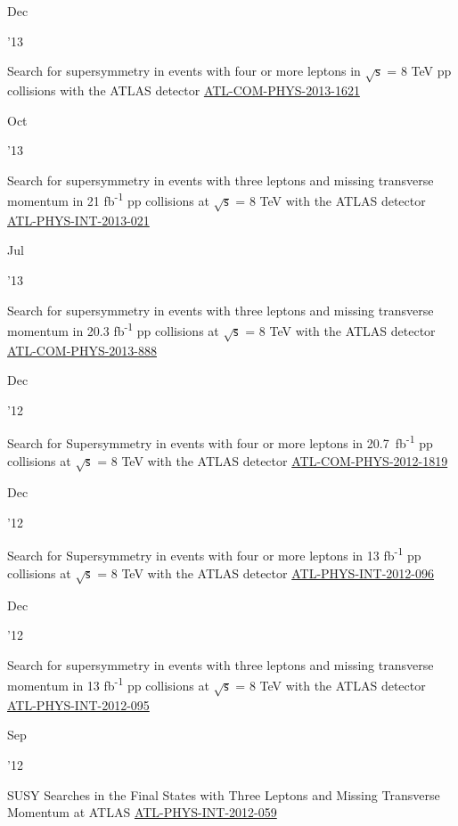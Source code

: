 \documentclass[]{cv} %
\begin{document}
\begin{entrylist}

\entry
{\parbox[t]{\parboxWidthOne}{Dec}\parbox[t]{\parboxWidthTwo}{\hfill '13}}
{Search for supersymmetry in events with four or more leptons in $\sqrt{\mathsf{s}}$ = 8 TeV pp collisions with the ATLAS
detector}
{\href{https://cds.cern.ch/record/1635455}{ATL-COM-PHYS-2013-1621}}
{\vspace*{\spacingPubs}}

\entry
{\parbox[t]{\parboxWidthOne}{Oct}\parbox[t]{\parboxWidthTwo}{\hfill '13}}
{Search for supersymmetry in events with three leptons and missing transverse momentum in 21 fb\textsuperscript{-1} pp collisions
at $\sqrt{\mathsf{s}}$ = 8 TeV with the ATLAS detector}
{\href{https://cds.cern.ch/record/1610185}{ATL-PHYS-INT-2013-021}}
{\vspace*{\spacingPubs}}

\entry
{\parbox[t]{\parboxWidthOne}{Jul}\parbox[t]{\parboxWidthTwo}{\hfill '13}}
{Search for supersymmetry in events with three leptons and missing transverse momentum in 20.3 fb\textsuperscript{-1} pp
collisions at $\sqrt{\mathsf{s}}$ = 8 TeV with the ATLAS detector}
{\href{https://cds.cern.ch/record/1558985}{ATL-COM-PHYS-2013-888}}
{\vspace*{\spacingPubs}}

\entry
{\parbox[t]{\parboxWidthOne}{Dec}\parbox[t]{\parboxWidthTwo}{\hfill '12}}
{Search for Supersymmetry in events with four or more leptons in 20.7~fb\textsuperscript{-1} pp collisions at $\sqrt{\mathsf{s}}$
= 8 TeV with the ATLAS detector}
{\href{https://cds.cern.ch/record/1501709}{ATL-COM-PHYS-2012-1819}}
{\vspace*{\spacingPubs}}

\entry
{\parbox[t]{\parboxWidthOne}{Dec}\parbox[t]{\parboxWidthTwo}{\hfill '12}}
{Search for Supersymmetry in events with four or more leptons in 13 fb\textsuperscript{-1} pp collisions at $\sqrt{\mathsf{s}}$ =
8 TeV with the ATLAS detector}
{\href{https://cds.cern.ch/record/1498627}{ATL-PHYS-INT-2012-096}}
{\vspace*{\spacingPubs}}

\entry
{\parbox[t]{\parboxWidthOne}{Dec}\parbox[t]{\parboxWidthTwo}{\hfill '12}}
{Search for supersymmetry in events with three leptons and missing transverse momentum in 13 fb\textsuperscript{-1} pp collisions
at $\sqrt{\mathsf{s}}$ = 8 TeV with the ATLAS detector}
{\href{https://cds.cern.ch/record/1498390}{ATL-PHYS-INT-2012-095}}
{\vspace*{\spacingPubs}}

\entry
{\parbox[t]{\parboxWidthOne}{Sep}\parbox[t]{\parboxWidthTwo}{\hfill '12}}
{SUSY Searches in the Final States with Three Leptons and Missing Transverse Momentum at ATLAS}
{\href{https://cds.cern.ch/record/1482141}{ATL-PHYS-INT-2012-059}}
{\vspace*{\spacingPubs}}

\end{entrylist}
\fi
\end{document}
